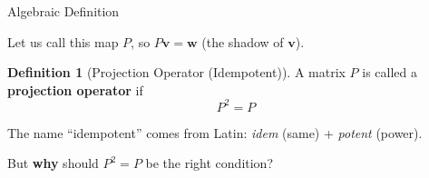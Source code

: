 \documentclass[10pt]{beamer}
\theoremstyle{definition}
\newtheorem{defi}{Definition}[section]
\newcommand{\x}[1]{\alert{\textbf{#1}}}
\begin{document}
\begin{frame}{Algebraic Definition}

Let us call this map $P$, so $P\mathbf{v} = \mathbf{w}$ (the shadow of $\mathbf{v}$).

\vspace{1em}

\begin{defi}[Projection Operator (Idempotent)]
A matrix $P$ is called a \x{projection operator} if
$$P^2 = P$$
\end{defi}

\vspace{1em}

The name ``idempotent'' comes from Latin: \textit{idem} (same) + \textit{potent} (power).

\vspace{1em}

But \x{why} should $P^2 = P$ be the right condition?

\end{frame}
\end{document}
